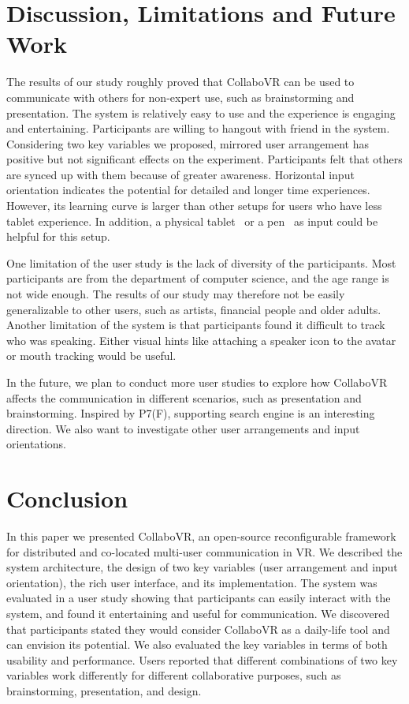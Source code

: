 \documentclass{sigchi}
\begin{document}
\section{Discussion, Limitations and Future Work}
The results of our study roughly proved that CollaboVR can be used to communicate with others for non-expert use, such as brainstorming and presentation. The system is relatively easy to use and the experience is engaging and entertaining. Participants are willing to hangout with friend in the system. Considering two key variables we proposed, mirrored user arrangement has positive but not significant effects on the experiment. Participants felt that others are synced up with them because of greater awareness. Horizontal input orientation indicates the potential for detailed and longer time experiences. However, its learning curve is larger than other setups for users who have less tablet experience. In addition, a physical tablet~\cite{sensel} or a pen~\cite{wu2017dodecapen} as input could be helpful for this setup. 

One limitation of the user study is the lack of diversity of the participants. Most participants are from the department of computer science, and the age range is not wide enough. The results of our study may therefore not be easily generalizable to other users, such as artists, financial people and older adults. Another limitation of the system is that participants found it difficult to track who was speaking. Either visual hints like attaching a speaker icon to the avatar or mouth tracking would be useful.

In the future, we plan to conduct more user studies to explore how CollaboVR affects the communication in different scenarios, such as presentation and brainstorming. Inspired by P7(F), supporting search engine is an interesting direction. We also want to investigate other user arrangements and input orientations.

\section{Conclusion}
In this paper we presented CollaboVR, an open-source reconfigurable framework for distributed and co-located multi-user communication in VR. We described the system architecture, the design of two key variables (user arrangement and input orientation), the rich user interface, and its implementation. The system was evaluated in a user study showing that participants can easily interact with the system, and found it entertaining and useful for communication. We discovered that participants stated they would consider CollaboVR as a daily-life tool and can envision its potential. We also evaluated the key variables in terms of both usability and performance. Users reported that different combinations of two key variables work differently for different collaborative purposes, such as brainstorming, presentation, and design.
\end{document}
